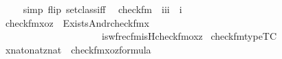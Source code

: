 \begin{isabellebody}
\ \ \ \ \isamarkupfalse%
\ {\isacharparenleft}{\kern0pt}simp\ flip{\isacharcolon}{\kern0pt}\ setclass{\isacharunderscore}{\kern0pt}iff{\isacharparenright}{\kern0pt}\isanewline
{}\isamarkupfalse%
%
\endisatagproof
{\isafoldproof}%
%
\isadelimproof
\isanewline
%
\endisadelimproof
\isanewline
\isanewline
{}\isamarkupfalse%
\isanewline
\ \ check{\isacharunderscore}{\kern0pt}fm\ {\isacharcolon}{\kern0pt}{\isacharcolon}{\kern0pt}\ {\isachardoublequoteopen}{\isacharbrackleft}{\kern0pt}i{\isacharcomma}{\kern0pt}i{\isacharcomma}{\kern0pt}i{\isacharbrackright}{\kern0pt}\ {\isasymRightarrow}\ i{\isachardoublequoteclose}\ \isanewline
\ \ {\isachardoublequoteopen}check{\isacharunderscore}{\kern0pt}fm{\isacharparenleft}{\kern0pt}x{\isacharcomma}{\kern0pt}o{\isacharcomma}{\kern0pt}z{\isacharparenright}{\kern0pt}\ {\isasymequiv}\ Exists{\isacharparenleft}{\kern0pt}And{\isacharparenleft}{\kern0pt}rcheck{\isacharunderscore}{\kern0pt}fm{\isacharparenleft}{\kern0pt}{}{\isacharhash}{\kern0pt}{\isacharplus}{\kern0pt}x{\isacharcomma}{\kern0pt}{}{\isacharparenright}{\kern0pt}{\isacharcomma}{\kern0pt}\isanewline
\ \ \ \ \ \ \ \ \ \ \ \ \ \ \ \ \ \ \ \ \ \ is{\isacharunderscore}{\kern0pt}wfrec{\isacharunderscore}{\kern0pt}fm{\isacharparenleft}{\kern0pt}is{\isacharunderscore}{\kern0pt}Hcheck{\isacharunderscore}{\kern0pt}fm{\isacharparenleft}{\kern0pt}{}{\isacharhash}{\kern0pt}{\isacharplus}{\kern0pt}o{\isacharcomma}{\kern0pt}{}{\isacharcomma}{\kern0pt}{}{\isacharcomma}{\kern0pt}{}{\isacharparenright}{\kern0pt}{\isacharcomma}{\kern0pt}{}{\isacharcomma}{\kern0pt}{}{\isacharhash}{\kern0pt}{\isacharplus}{\kern0pt}x{\isacharcomma}{\kern0pt}{}{\isacharhash}{\kern0pt}{\isacharplus}{\kern0pt}z{\isacharparenright}{\kern0pt}{\isacharparenright}{\kern0pt}{\isacharparenright}{\kern0pt}{\isachardoublequoteclose}\isanewline
\isanewline
{}\isamarkupfalse%
\ check{\isacharunderscore}{\kern0pt}fm{\isacharunderscore}{\kern0pt}type{\isacharbrackleft}{\kern0pt}TC{\isacharbrackright}{\kern0pt}\ {\isacharcolon}{\kern0pt}\isanewline
\ \ {\isachardoublequoteopen}{\isasymlbrakk}x{\isasymin}nat{\isacharsemicolon}{\kern0pt}o{\isasymin}nat{\isacharsemicolon}{\kern0pt}z{\isasymin}nat{\isasymrbrakk}\ {\isasymLongrightarrow}\ check{\isacharunderscore}{\kern0pt}fm{\isacharparenleft}{\kern0pt}x{\isacharcomma}{\kern0pt}o{\isacharcomma}{\kern0pt}z{\isacharparenright}{\kern0pt}{\isasymin}formula{\isachardoublequoteclose}\isanewline

\end{isabellebody}
